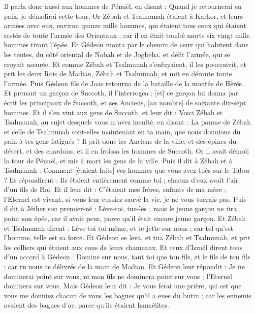 \begin{multicols}{2}
Il parla donc aussi aux hommes de Pénuël, en disant : Quand je retournerai en paix, je démolirai cette tour.
Or Zébah et Tsalmunah étaient à Karkor, et leurs armées avec eux, environ quinze mille hommes, qui étaient tous ceux qui étaient restés de toute l'armée des Orientaux ; car il en était tombé morts six vingt mille hommes tirant l'épée.
Et Gédeon monta par le chemin de ceux qui habitent dans les tentes, du côté oriental de Nobah et de Jogbeha, et défit l'armée, qui se croyait assurée.
Et comme Zébah et Tsalmunah s'enfuyaient, il les poursuivit, et prit les deux Rois de Madian, Zébah et Tsalmunah, et mit en déroute toute l'armée.
Puis Gédeon fils de Joas retourna de la bataille de la montée de Hèrés.
Et prenant un garçon de Succoth, il l'interrogea ; [et] ce garçon lui donna par écrit les principaux de Succoth, et ses Anciens, [au nombre] de soixante dix-sept hommes.
Et il s'en vint aux gens de Succoth, et leur dit : Voici Zébah et Tsalmunah, au sujet desquels vous m'avez insulté, en disant : La paume de Zébah et celle de Tsalmunah sont-elles maintenant en ta main, que nous donnions du pain à tes gens fatigués ?
Il prit donc les Anciens de la ville, et des épines du désert, et des chardons, et il en froissa les hommes de Succoth.
Or il avait démoli la tour de Pénuël, et mis à mort les gens de la ville.
Puis il dit à Zébah et à Tsalmunah : Comment [étaient faits] ces hommes que vous avez tués sur le Tabor ? Ils répondirent : Ils étaient entièrement comme toi ; chacun d'eux avait l'air d'un fils de Roi.
Et il leur dit : C'étaient mes frères, enfants de ma mère ; l'Eternel est vivant, si vous leur eussiez sauvé la vie, je ne vous tuerais pas.
Puis il dit à Jéther son premier-né : Lève-toi, tue-les ; mais le jeune garçon ne tira point son épée, car il avait peur, parce qu'il était encore jeune garçon.
Et Zébah et Tsalmunah dirent : Lève-toi toi-même, et te jette sur nous ; car tel qu'est l'homme, telle est sa force. Et Gédeon se leva, et tua Zébah et Tsalmunah, et prit les colliers qui étaient aux cous de leurs chameaux.
Et ceux d'Israël dirent tous d'un accord à Gédeon : Domine sur nous, tant toi que ton fils, et le fils de ton fils ; car tu nous as délivrés de la main de Madian.
Et Gédeon leur répondit : Je ne dominerai point sur vous, ni mon fils ne dominera point sur vous ; l'Eternel dominera sur vous.
Mais Gédeon leur dit : Je vous ferai une prière, qui est que vous me donniez chacun de vous les bagues qu'il a eues du butin ; car les ennemis avaient des bagues d'or, parce qu'ils étaient Ismaélites.

\end{multicols}

